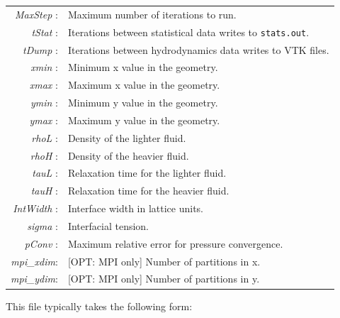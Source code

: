 \documentclass[12pt]{report}
\begin{document}
\begin{longtable}{rl}
\textit{MaxStep}  :& Maximum number of iterations to run.\\
\textit{tStat}    :& Iterations between statistical data writes to \verb+stats.out+.\\
\textit{tDump}    :& Iterations between hydrodynamics data writes to VTK files.\\
\textit{xmin}     :& Minimum x value in the geometry.\\
\textit{xmax}     :& Maximum x value in the geometry.\\
\textit{ymin}     :& Minimum y value in the geometry.\\
\textit{ymax}     :& Maximum y value in the geometry.\\
\textit{rhoL}     :& Density of the lighter fluid.\\
\textit{rhoH}     :& Density of the heavier fluid.\\
\textit{tauL}     :& Relaxation time for the lighter fluid.\\
\textit{tauH}     :& Relaxation time for the heavier fluid.\\
\textit{IntWidth} :& Interface width in lattice units.\\
\textit{sigma}    :& Interfacial tension.\\
\textit{pConv}    :& Maximum relative error for pressure convergence.\\
\textit{mpi\_xdim}:& [OPT: MPI only] Number of partitions in x.\\
\textit{mpi\_ydim}:& [OPT: MPI only] Number of partitions in y.\\
\end{longtable}

This file typically takes the following form:

\end{document}
